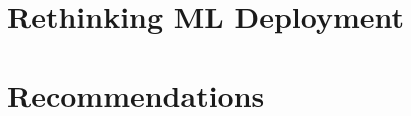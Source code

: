 \documentclass[sigconf,authorversion,nonacm]{acmart}
\begin{document}
\section{Rethinking ML Deployment}\label{sec:rethinkingmodeldeployment}

\section{Recommendations}














\end{document}
